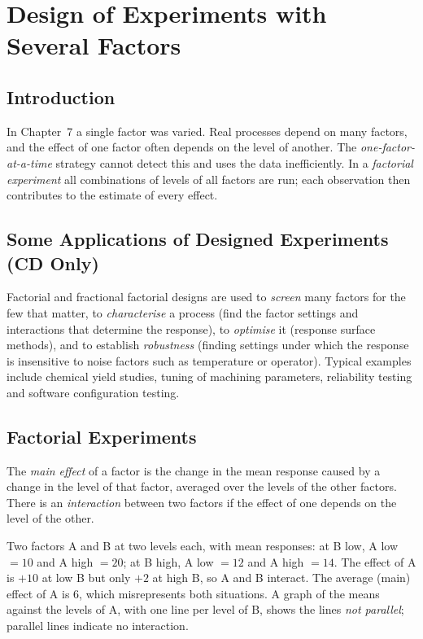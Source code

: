 \chapter{Design of Experiments with Several Factors}

\section{Introduction}

In Chapter~7 a single factor was varied. Real processes depend on many factors, and the effect of one factor often depends on the level of another. The \emph{one-factor-at-a-time} strategy cannot detect this and uses the data inefficiently. In a \emph{factorial experiment} all combinations of levels of all factors are run; each observation then contributes to the estimate of every effect.

\section{Some Applications of Designed Experiments (CD Only)}

Factorial and fractional factorial designs are used to \emph{screen} many factors for the few that matter, to \emph{characterise} a process (find the factor settings and interactions that determine the response), to \emph{optimise} it (response surface methods), and to establish \emph{robustness} (finding settings under which the response is insensitive to noise factors such as temperature or operator). Typical examples include chemical yield studies, tuning of machining parameters, reliability testing and software configuration testing.

\section{Factorial Experiments}

\begin{definition}
The \emph{main effect} of a factor is the change in the mean response caused by a change in the level of that factor, averaged over the levels of the other factors. There is an \emph{interaction} between two factors if the effect of one depends on the level of the other.
\end{definition}

\begin{example}\label{ex:interaction}
Two factors A and B at two levels each, with mean responses: at B low, A low $=10$ and A high $=20$; at B high, A low $=12$ and A high $=14$. The effect of A is $+10$ at low B but only $+2$ at high B, so A and B interact. The average (main) effect of A is $6$, which misrepresents both situations. A graph of the means against the levels of A, with one line per level of B, shows the lines \emph{not parallel}; parallel lines indicate no interaction.
\end{example}

